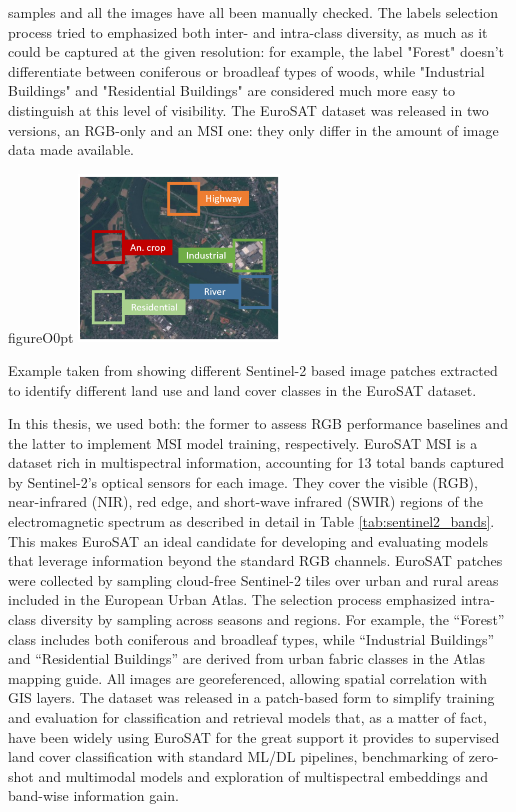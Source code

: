 \documentclass[a4paper, twoside, english]{sapthesis} %
\begin{document}
samples and all the images have all been manually checked. The labels selection process tried to emphasized both inter- and intra-class diversity, as much as it could be captured at the given resolution: for example, the label "Forest" doesn't differentiate between coniferous or broadleaf types of woods, while "Industrial Buildings" and "Residential Buildings" are considered much more easy to distinguish at this level of visibility. The EuroSAT dataset was released in two versions, an RGB-only and an MSI one: they only differ in the amount of image data made available.

\begin{wrapfloat}{figure}{O}{0pt} %
    \includegraphics[width=0.4\textwidth]{img/EuroSAT_paper.png}
    \caption{\normalsize Example taken from \cite{helber2019eurosat} showing different Sentinel-2 based image patches extracted to identify different land use and land cover classes in the EuroSAT dataset.}
    \label{fig:eurosatpatch}
\end{wrapfloat}

In this thesis, we used both: the former to assess RGB performance baselines and the latter to implement MSI model training, respectively. EuroSAT MSI is a dataset rich in multispectral information, accounting for 13 total bands captured by Sentinel-2's optical sensors for each image. They cover the visible (RGB), near-infrared (NIR), red edge, and short-wave infrared (SWIR) regions of the electromagnetic spectrum as described in detail in Table \ref{tab:sentinel2_bands}. This makes EuroSAT an ideal candidate for developing and evaluating models that leverage information beyond the standard RGB channels.
EuroSAT patches were collected by sampling cloud-free Sentinel-2 tiles over urban and rural areas included in the European Urban Atlas. The selection process emphasized intra-class diversity by sampling across seasons and regions. For example, the “Forest” class includes both coniferous and broadleaf types, while “Industrial Buildings” and “Residential Buildings” are derived from urban fabric classes in the Atlas mapping guide. All images are georeferenced, allowing spatial correlation with GIS layers. The dataset was released in a patch-based form to simplify training and evaluation for classification and retrieval models that, as a matter of fact, have been widely using EuroSAT for the great support it provides to supervised land cover classification with standard ML/DL pipelines, benchmarking of zero-shot and multimodal models and exploration of multispectral embeddings and band-wise information gain.
\end{document}
